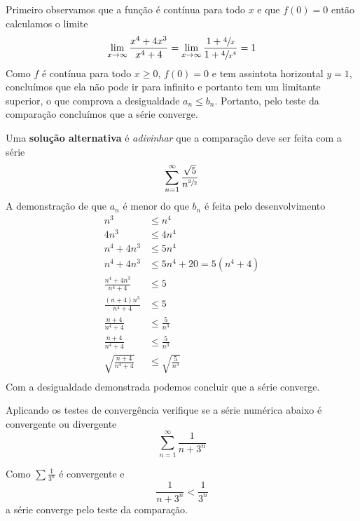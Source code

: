 \begin{exercises}
\begin{exercise}
\begin{answer}
  Primeiro observamos que a função é contínua para todo $x$ e que $f(0)=0$
  então calculamos o limite
  \[
  \lim_{x\to\infty} \frac{x^4+4x^3}{x^4+4} =
  \lim_{x\to\infty} \frac{1+\sfrac{4}{x}}{1+\sfrac{4}{x^4}}  = 1
  \]
  Como $f$ é contínua para todo $x\geq 0$, $f(0)=0$ e tem assintota
  horizontal $y=1$, concluímos que ela não pode ir para infinito e portanto
  tem um limitante superior, o que comprova a desigualdade $a_n\leq b_n$.
  Portanto, pelo teste da comparação concluímos que a série converge.


  \vspace{\baselineskip}
  Uma \textbf{solução alternativa} é \textit{adivinhar}
  que a comparação deve ser feita com a série
  \[ \sum_{n=1}^{\infty} \frac{\sqrt{5}}{n^{\sfrac{3}{2}}} \]
  A demonstração de que $a_n$ é menor do que $b_n$ é feita pelo
  desenvolvimento
  \begin{align*}
  	n^3                        & \leq n^4                  \\
  	4n^3                       & \leq 4n^4                 \\
  	n^4 + 4n^3                 & \leq 5n^4                 \\
  	n^4 + 4n^3                 & \leq 5n^4 + 20 = 5(n^4+4) \\[2mm]
  	\frac{n^4 + 4n^3}{n^4+4}   & \leq 5                    \\[2mm]
  	\frac{(n + 4)n^3}{n^4+4}   & \leq 5                    \\[2mm]
  	\frac{n + 4}{n^4+4}        & \leq \frac{5}{n^3}        \\[2mm]
  	\frac{n + 4}{n^4+4}        & \leq \frac{5}{n^3}        \\[2mm]
  	\sqrt{\frac{n + 4}{n^4+4}} & \leq \sqrt{\frac{5}{n^3}} \\[2mm]
  \end{align*}
  Com a desigualdade demonstrada podemos concluir que a série converge.
\end{answer}
\end{exercise}

\begin{exercise}
  Aplicando os testes de convergência verifique se a série numérica abaixo
  é convergente ou divergente
  \[
    \sum_{n=1}^{\infty} \frac{1}{n+3^n}
  \]
  \begin{answer}
    Como \(\sum\frac{1}{3^n}\) é convergente e
    \[
      \frac{1}{n+3^n} < \frac{1}{3^n}
    \]
    a série converge pelo teste da comparação.
  \end{answer}
\end{exercise}


\end{exercises}
